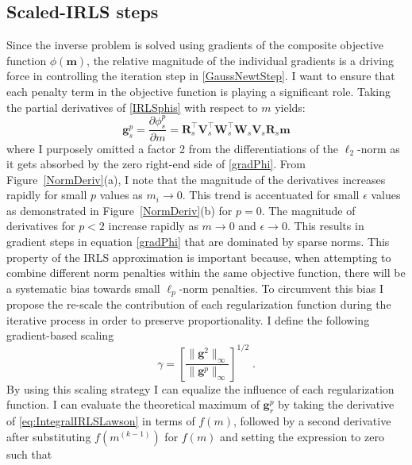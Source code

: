 \subsection{Scaled-IRLS steps}
Since the inverse problem is solved using gradients of the composite objective function $\phi(\mathbf{m})$, the relative magnitude of the individual gradients is a driving force in controlling the iteration step in \eqref{GaussNewtStep}. I want to ensure that each penalty term in the objective function is playing a significant role.
Taking the partial derivatives of \eqref{IRLSphis} with respect to $m$ yields:
\begin{equation}\label{eq:IRLS_Grad_genericMat}
\mathbf{g}_s^{p} = \frac{\partial \phi_s^{p}}{\partial {m}} = \mathbf{R}^\top_{s} \mathbf{V}^\top_{s} \mathbf{W}^\top_{s} \mathbf{W}_{s} \mathbf{V}_{s} \mathbf{R}_{s} \mathbf{m} 
\end{equation}
where I purposely omitted a factor 2 from the differentiations of the $\ell_2$-norm as it gets absorbed by the zero right-end side of \eqref{gradPhi}. 
From Figure~\ref{NormDeriv}(a), I note that the magnitude of the derivatives increases rapidly for small $p$ values as $m_i \rightarrow 0$. This trend is accentuated for small $\epsilon$ values as demonstrated in Figure~\ref{NormDeriv}(b) for $p=0$. The magnitude of derivatives for $p<2$ increase rapidly as $m\rightarrow 0$ and $\epsilon\rightarrow 0$. This results in gradient steps in equation \eqref{gradPhi} that are dominated by sparse norms. 
This property of the IRLS approximation is important because, when attempting to combine different norm penalties within the same objective function, there will be a systematic bias towards small $\ell_p$-norm penalties.
To circumvent this bias I propose the re-scale the contribution of each regularization function during the iterative process in order to preserve proportionality.
I define the following gradient-based scaling
\begin{equation}\label{gammaScale}
\gamma = \left[\frac{\|\mathbf{g}^2\|_\infty}{\|\mathbf{g}^p\|_\infty}\right]^{1/2}\;.
\end{equation}
By using this scaling strategy I can equalize the influence of each regularization function. 
I can evaluate the theoretical maximum of $\mathbf{g}^p_r$ by taking the derivative of \eqref{eq:IntegralIRLSLawson} in terms of $f(m)$, followed by a second derivative after substituting $f(m^{(k-1)})$ for $f(m)$ and setting the expression to zero such that 
